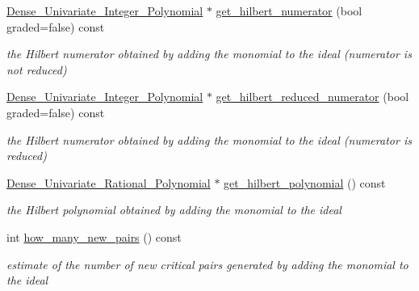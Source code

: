 \begin{Indent}
\begin{DoxyCompactItemize}
\hyperlink{group__polygroup_class_dense___univariate___integer___polynomial}{Dense\+\_\+\+Univariate\+\_\+\+Integer\+\_\+\+Polynomial} $\ast$ \hyperlink{group___g_b_computation_aaef635310e198cfa9f9da6fd50c4bc84}{get\+\_\+hilbert\+\_\+numerator} (bool graded=false) const
\begin{DoxyCompactList}\small\item\em the Hilbert numerator obtained by adding the monomial to the ideal (numerator is {\itshape not} reduced) \end{DoxyCompactList}\item 
\mbox{\label{group___g_b_computation_af9df84889effb9b5805413e8a0affa88}} 
\hyperlink{group__polygroup_class_dense___univariate___integer___polynomial}{Dense\+\_\+\+Univariate\+\_\+\+Integer\+\_\+\+Polynomial} $\ast$ \hyperlink{group___g_b_computation_af9df84889effb9b5805413e8a0affa88}{get\+\_\+hilbert\+\_\+reduced\+\_\+numerator} (bool graded=false) const
\begin{DoxyCompactList}\small\item\em the Hilbert numerator obtained by adding the monomial to the ideal (numerator {\itshape is} reduced) \end{DoxyCompactList}\item 
\mbox{\label{group___g_b_computation_a6fa88df78315031c9bfcc58b8d8acb1a}} 
\hyperlink{group__polygroup_class_dense___univariate___rational___polynomial}{Dense\+\_\+\+Univariate\+\_\+\+Rational\+\_\+\+Polynomial} $\ast$ \hyperlink{group___g_b_computation_a6fa88df78315031c9bfcc58b8d8acb1a}{get\+\_\+hilbert\+\_\+polynomial} () const
\begin{DoxyCompactList}\small\item\em the Hilbert polynomial obtained by adding the monomial to the ideal \end{DoxyCompactList}\item 
\mbox{\label{group___g_b_computation_afb9a43c24f2d0405d1c60e12983c8003}} 
int \hyperlink{group___g_b_computation_afb9a43c24f2d0405d1c60e12983c8003}{how\+\_\+many\+\_\+new\+\_\+pairs} () const
\begin{DoxyCompactList}\small\item\em estimate of the number of new critical pairs generated by adding the monomial to the ideal \end{DoxyCompactList}\item 

\end{DoxyCompactItemize}
\end{Indent}
